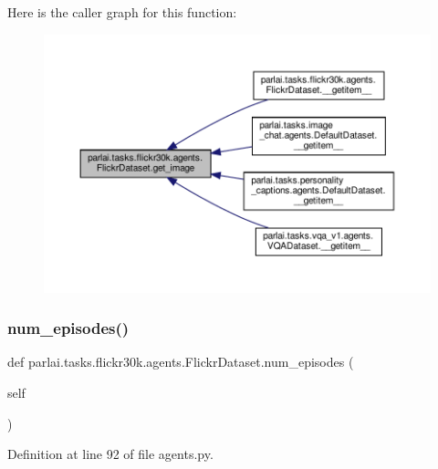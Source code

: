 Here is the caller graph for this function\+:
\nopagebreak
\begin{figure}[H]
\begin{center}
\leavevmode
\includegraphics[width=350pt]{classparlai_1_1tasks_1_1flickr30k_1_1agents_1_1FlickrDataset_af2517dc3b4a7670305ad9a517a8d49c1_icgraph}
\end{center}
\end{figure}
\mbox{\label{classparlai_1_1tasks_1_1flickr30k_1_1agents_1_1FlickrDataset_aa973995adc1552143c69474ead14fa59}} 
\subsubsection{\texorpdfstring{num\+\_\+episodes()}{num\_episodes()}}
{\footnotesize\ttfamily def parlai.\+tasks.\+flickr30k.\+agents.\+Flickr\+Dataset.\+num\+\_\+episodes (\begin{DoxyParamCaption}\item[{}]{self }\end{DoxyParamCaption})}



Definition at line 92 of file agents.\+py.



